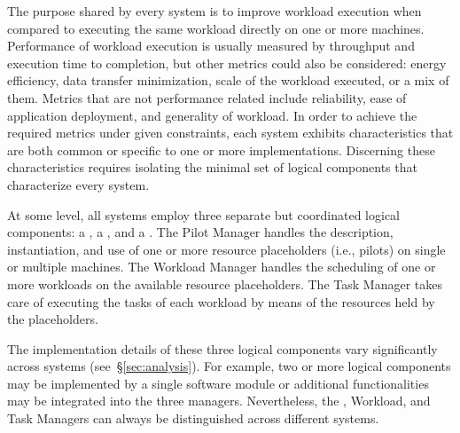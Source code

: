 \documentclass{sig-alternate}
\begin{document}
The purpose shared by every \pilotjob system is to improve workload execution
when compared to executing the same workload directly on one or more machines.
Performance of workload execution is usually measured by throughput and
execution time to completion, but other metrics could also be considered: energy
efficiency, data transfer minimization, scale of the workload executed, or a mix
of them. Metrics that are not performance related include reliability, ease of
application deployment, and generality of workload. In order to achieve the
required metrics under given constraints, each \pilotjob system exhibits
characteristics that are both common or specific to one or more implementations.
Discerning these characteristics requires isolating the minimal set of logical
components that characterize every \pilotjob system.

At some level, all \pilotjob systems employ three separate but coordinated
logical components: a , a , and a
. The Pilot Manager handles the description, instantiation,
and use of one or more resource placeholders (i.e., pilots) on single or
multiple machines. The Workload Manager handles the scheduling of one or more
workloads on the available resource placeholders. The Task Manager takes care of
executing the tasks of each workload by means of the resources held by the
placeholders.

The implementation details of these three logical components vary significantly
across \pilotjob systems (see~\S\ref{sec:analysis}). For example, two or more
logical components may be implemented by a single software module or additional
functionalities may be integrated into the three managers. Nevertheless, the
\pilot, Workload, and Task Managers can always be distinguished across different
\pilotjob systems.


\end{document}
